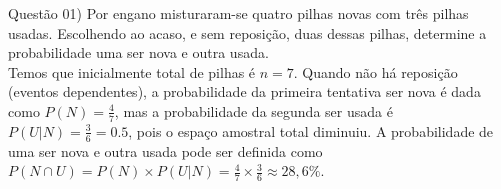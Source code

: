 
\noindent \textcolor{COLOR1}{Questão 01)} Por engano misturaram-se quatro pilhas novas com três pilhas usadas. Escolhendo ao acaso, e sem  reposição, duas dessas pilhas, determine a probabilidade uma ser nova e outra usada.
\\

Temos que inicialmente total de pilhas é $n = 7$. Quando não há reposição (eventos dependentes), a probabilidade da primeira tentativa ser nova é dada como $P(N) = \frac{4}{7}$, mas a probabilidade da segunda ser usada é $P(U|N) = \frac{3}{6} = 0.5$, pois o espaço amostral total diminuiu. A probabilidade de uma ser nova e outra usada pode ser definida como $P(N\cap U)=P(N)\times P(U|N) = \frac{4}{7}\times \frac{3}{6} \approx 28,6\%$.\\